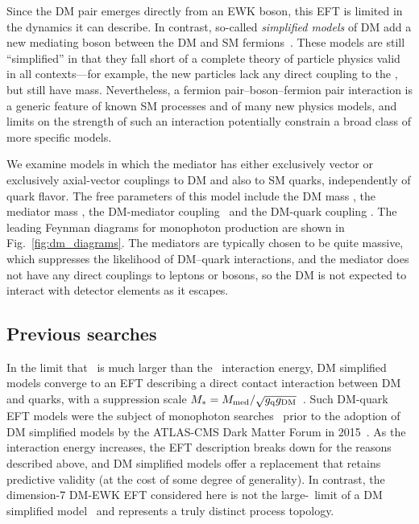 Since the DM pair emerges directly from an EWK boson, this EFT is limited in the dynamics it can describe. In contrast, so-called \textit{simplified models} of DM add
a new mediating boson between the DM and SM fermions~\cite{ref:1507.00966}. These models are still ``simplified'' in that they fall short of a complete theory of particle
physics valid in all contexts---for example, the new particles lack any direct coupling to the \PH, but still have mass.
Nevertheless, a fermion pair--boson--fermion pair interaction is a generic feature of known SM processes
and of many new physics models, and limits on the strength of such an interaction potentially constrain a broad class of more specific models.

We examine models in which the mediator has either exclusively vector or exclusively axial-vector couplings to DM and also to SM quarks, independently
of quark flavor. The free parameters of this model include
the DM mass \mdm, the mediator mass \mmed, the DM-mediator coupling \gdm\ and the DM-quark coupling \gq.
The leading Feynman diagrams for monophoton production are shown in Fig.~\ref{fig:dm_diagrams}. The mediators are typically chosen to be quite massive,
which suppresses the likelihood of DM--quark interactions, and the mediator does not have any direct couplings to leptons or bosons,
so the DM is not expected to interact with detector elements as it escapes.

\subsection{Previous searches} \label{sec:introduction_dm_previous_searches}
In the limit that \mmed\ is much larger than the \Pq\Paq\ interaction energy, DM simplified models converge to an EFT describing a direct contact
interaction between DM and quarks, with a suppression scale $M_\mathrm{*} = M_\mathrm{med}/\sqrt{g_\mathrm{q}g_\mathrm{DM}}$~\cite{ref:1603.04156}.
Such DM-quark EFT models were the subject of monophoton searches~\cite{ref:j.physletb.2016.01.057, ref:PhysRevD.91.012008} prior to the adoption of
DM simplified models by the ATLAS-CMS Dark Matter Forum in 2015~\cite{ref:1507.00966}.
As the interaction energy increases, the EFT description breaks down for the reasons described above, and DM simplified models
offer a replacement that retains predictive validity (at the cost of some degree of generality).
In contrast, the dimension-7 DM-EWK EFT considered here is not the large-\mmed\ limit of a DM simplified model~\cite{ref:1507.00966} and represents a truly distinct
process topology.

